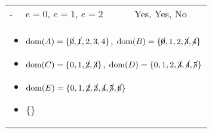 \begin{example}
\begin{center}
\begin{tabular}{lll}
            - & $e=0$, $e=1$, $e=2$ & Yes, Yes, No\\
            \multicolumn{3}{p{\linewidth}}{
            \begin{itemize}
                \item $\text{dom}(A) = \{\cancel{0}, \cancel{1}, 2, 3, 4\}$, $\text{dom}(B) = \{\cancel{0}, 1, 2, \cancel{3}, \cancel{4}\} $
                \item $\text{dom}(C) = \{0, 1, \cancel{2}, \cancel{3}\} $, $\text{dom}(D) = \{0, 1, 2, \cancel{3}, \cancel{4}, \cancel{5}\} $
                \item $\text{dom}(E) = \{0, 1, \cancel{2}, \cancel{3}, \cancel{4}, \cancel{5}, \cancel{6}\} $
                \item $\{\}$
            \end{itemize}} \\
            \bottomrule
        \end{tabular}
    \end{center}
\end{example}
\newpage

